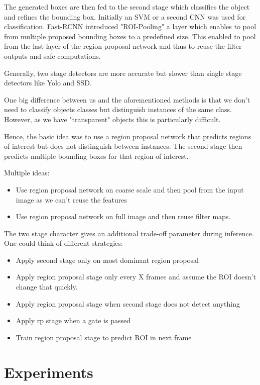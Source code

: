 \documentclass{article}
\begin{document}
The generated boxes are then fed to the second stage which classifies the object and refines the bounding box.
Initially an SVM or a second CNN was used for classification. Fast-RCNN introduced "ROI-Pooling" a layer which enables to pool from multiple proposed bounding boxes to a predefined size. This enabled to pool from the last layer of the region proposal network and thus to reuse the filter outputs and safe computations. 

Generally, two stage detectors are more accurate but slower than single stage detectors like Yolo and SSD.

One big difference between us and the aforementioned  methods is that we don't need to classify objects classes but distinguish instances of the same class. However, as we have "transparent" objects this is particularly difficult. 

Hence, the basic idea was to use a region proposal network that predicts regions of interest but does not distinguish between instances. The second stage then predicts multiple bounding boxes for that region of interest. 

Multiple ideas:
\begin{itemize}
	\item Use region proposal network on coarse scale and then pool from the input image as we can't reuse the features
	\item Use region proposal network on full image and then reuse filter maps.
\end{itemize}

The two stage character gives an additional trade-off parameter during inference. One could think of different strategies:
\begin{itemize}
	\item Apply second stage only on most dominant region proposal
	\item Apply region proposal stage only every X frames and assume the ROI doesn't change that quickly.
	\item Apply region proposal stage when second stage does not detect anything
	\item Apply rp stage when a gate is passed
	\item Train region proposal stage to predict ROI in next frame
\end{itemize} 

\section{Experiments}
\end{document}
